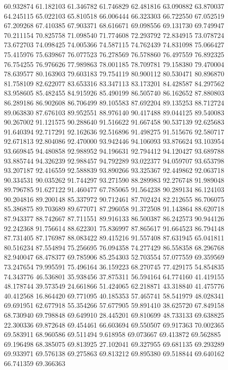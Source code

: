 60.932874
61.182103
61.346782
61.746829
62.481816
63.090882
63.870037
64.245115
65.022103
65.810518
66.006444
66.323303
66.722550
67.052519
67.209268
67.410385
67.903371
68.616671
69.098556
69.131730
69.749947
70.211154
70.825758
71.098540
71.774608
72.293792
72.834915
73.078724
73.672703
74.098425
74.005366
74.587115
74.762439
74.831098
75.066427
75.415976
75.639867
76.077523
76.278569
76.578860
76.497559
76.892325
76.754255
76.976626
77.989863
78.001185
78.709781
79.158380
79.470004
78.639577
80.163903
79.603183
79.754119
80.900112
80.530471
80.896870
81.758109
82.622077
83.653316
83.347113
83.173201
84.428587
84.297562
83.958605
85.482455
84.915926
85.490199
86.505740
86.162652
87.880803
86.289186
86.902608
86.706499
89.105583
87.692204
89.135253
88.712724
89.063830
87.676103
89.952551
88.976140
90.417488
89.044125
89.540083
90.267002
91.121575
90.288640
91.516622
91.667458
90.537139
92.625683
91.640394
92.717291
92.162636
92.516896
91.498275
91.515676
92.580717
92.671813
92.804086
92.470000
93.942446
94.106093
93.876624
93.103954
93.669845
94.480858
92.988952
94.196631
92.794412
94.120427
93.689788
93.885744
94.326239
92.988457
94.792289
93.022377
94.059707
93.653798
93.207187
92.416559
92.588839
93.890266
93.325367
92.449862
92.063718
90.334531
90.035262
91.744297
93.271590
88.289983
92.276748
91.989048
89.796785
91.627122
91.460477
67.785065
91.564238
90.289134
86.124103
90.204816
89.200148
85.337972
90.712461
87.702424
82.212655
86.706075
85.386875
89.703689
89.677071
87.296058
91.372508
91.143864
88.620718
87.943377
88.742667
87.711551
89.916133
86.500387
86.242573
90.944126
92.242368
91.756614
88.622301
75.836997
87.865617
91.664523
86.794148
87.731405
87.176987
88.083422
89.415216
91.557408
87.631945
65.041811
80.516234
87.554894
75.256695
76.094358
74.277429
86.558358
68.296768
82.940047
68.478377
69.785906
85.254303
52.703554
57.077559
69.359569
73.247654
79.995591
75.496164
36.159223
68.270745
77.429175
54.854835
74.343776
46.536801
35.938456
37.875311
56.594164
64.774160
41.419155
48.178744
39.573549
24.661866
51.424065
62.218871
43.318840
41.475776
40.412568
16.864420
69.771095
40.185353
57.465741
58.541979
48.028341
69.691951
62.677918
55.354266
57.677905
59.891410
38.625720
67.849158
68.730940
69.798848
69.649910
28.445201
69.810699
48.733133
69.638825
22.300336
69.872648
69.454461
66.603694
69.550507
69.917363
70.002365
69.583911
68.960586
69.511494
9.618958
69.073667
69.413872
69.562885
69.196498
68.385075
69.813925
27.102041
69.327955
69.681135
69.293289
69.933971
69.576138
69.275863
69.813212
69.895380
69.518844
69.640162
66.741359
69.366363
